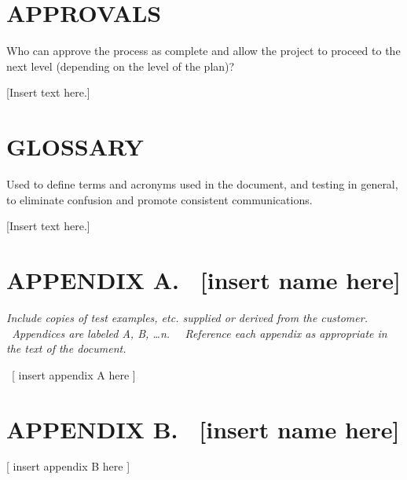 \section[APPROVALS]{\bfseries\color{black} APPROVALS}
{\itshape\color{black}

Who can approve the process as complete and allow the project to
proceed to the next level (depending on the level of the plan)? 

}
{\color{black}
[Insert text here.]}

\section[GLOSSARY]{\bfseries\color{black} GLOSSARY}

{\itshape\color{black}

Used to define terms and acronyms used in the document, and testing in
general, to eliminate confusion and promote consistent communications.

}
{\color{black}
[Insert text here.]}



\clearpage\setcounter{page}{1}\pagestyle{Convertviii}
\section[APPENDIX A. \ [insert name
here{]}]{\bfseries\color{black} APPENDIX A.
\ [insert name here]}
{\itshape\color{black}
Include copies of test examples, etc. supplied or
derived from the customer. \ Appendices are labeled A, B, {\dots}n.
\ \ Reference each appendix as appropriate in the text of the document.
}

{\color{black}
\ [ insert appendix A here ]}

\clearpage\setcounter{page}{1}\pagestyle{Convertix}
\section[APPENDIX B. \ [insert name
here{]}]{\bfseries\color{black} APPENDIX B.
\ [insert name here]}

\bigskip

{\color{black}
[ insert appendix B here ]}


\bigskip
